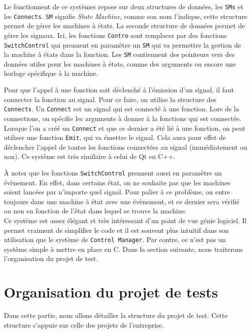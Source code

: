 \documentclass[a4paper]{article}
\begin{document}
Le fonctionnent de ce systèmes repose sur deux structures de données, les
\verb|SMs| et les \verb|Connects|. \verb|SM| signifie \textit{State Machine},
comme son nom l'indique, cette structure permet de gérer les machines à états.
La seconde structure de données permet de gérer les signaux. Ici, les fonctions
\verb|Contro| sont remplacer par des fonctions \verb|SwitchControl| qui prennent
en paramètre un \verb|SM| qui va permettre la gestion de la machine à états dans
la fonction. Les \verb|SM| contiennent des pointeurs vers des données utiles
pour les machines à états, comme des arguments ou encore une horloge spécifique
à la machine.

Pour que l'appel à une fonction soit déclenché à l'émission d'un signal, il faut
connecter la fonction au signal. Pour ce faire, on utilise la structure des
\verb|Connects|. Un \verb|Connect| est un signal qui est connecté à une
fonction. Lors de la connections, on spécifie les arguments à donner à la
fonctions qui est connectée. Lorsque l'on a créé un \verb|Connect| et que ce
dernier a été lié à une fonction, on peut utiliser une fonction \verb|Emit|, qui
va émettre le signal. Cela aura pour effet de déclencher l'appel de toutes les
fonctions connectées au signal (immédiatement ou non). Ce système est très
similaire à celui de Qt en C++.

À noter que les fonctions \verb|SwitchControl| prennent aussi en paramètre un
évènement. En effet, dans certains état, on ne souhaite pas que les machines
soient lancées par n'importe quel signal. Pour palier à ce problème, on entre
toujours dans une machine à état avec une évènement, et ce dernier sera vérifié
ou non en fonction de l'état dans lequel se trouve la machine.\\

Ce système est assez élégant et très intéressant d'un point de vue génie
logiciel. Il permet vraiment de simplifier le code et il est souvent plus
intuitif dans son utilisation que le système de \verb|Control Manager|. Par
contre, ce n'est pas un système simple à mettre en place en C. Dans la section
suivante, nous traiterons l'organisation du projet de test.
\section{Organisation du projet de tests}%

Dans cette partie, nous allons détailler la structure du projet de test. Cette
structure s'appuie sur celle des projets de l'entreprise.
\end{document}
